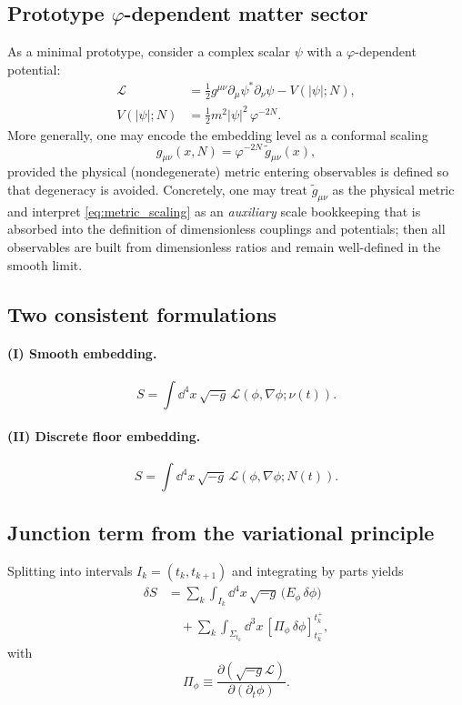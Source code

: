 \documentclass[
  reprint,
  amsmath,amssymb,
  aps,
  prd,
  superscriptaddress,
  nofootinbib,
  longbibliography
]{revtex4-2}
\newcommand{\phig}{\varphi}
\newcommand{\Sig}{\Sigma}
\theoremstyle{definition}
\theoremstyle{remark}
\begin{document}
\subsection{\texorpdfstring{Prototype $\phig$-dependent matter sector}{Prototype phi-dependent matter sector}}
As a minimal prototype, consider a complex scalar $\psi$ with a $\phig$-dependent potential:
\begin{align}
\mathcal L
&=\frac12 g^{\mu\nu}\partial_\mu\psi^*\partial_\nu\psi - V(|\psi|;N),
\nonumber\\
V(|\psi|;N)
&=\frac12 m^2|\psi|^2\,\phig^{-2N}.
\label{eq:prototype_L}
\end{align}
More generally, one may encode the embedding level as a conformal scaling
\begin{equation}
g_{\mu\nu}(x,N)=\phig^{-2N}\,\tilde g_{\mu\nu}(x),
\label{eq:metric_scaling}
\end{equation}
provided the physical (nondegenerate) metric entering observables is defined so that degeneracy is avoided.
Concretely, one may treat \(\tilde g_{\mu\nu}\) as the physical metric and interpret \eqref{eq:metric_scaling}
as an \emph{auxiliary} scale bookkeeping that is absorbed into the definition of dimensionless couplings and
potentials; then all observables are built from dimensionless ratios and remain well-defined in the smooth limit.

\subsection{Two consistent formulations}
\paragraph{(I) Smooth embedding.}
\begin{equation}
S=\int \dd^4x\,\sqrt{-g}\,\mathcal L(\phi,\nabla\phi;\nu(t)).
\label{eq:action_smooth_nu}
\end{equation}

\paragraph{(II) Discrete floor embedding.}
\begin{equation}
S=\int \dd^4x\,\sqrt{-g}\,\mathcal L(\phi,\nabla\phi;N(t)).
\label{eq:action_floorN}
\end{equation}

\subsection{Junction term from the variational principle}
Splitting into intervals $I_k=(t_k,t_{k+1})$ and integrating by parts yields
\begin{align}
\delta S
&=\sum_k \int_{I_k}\dd^4x\,\sqrt{-g}\,\Big(E_\phi\,\delta\phi\Big)
\nonumber\\
&\quad+\sum_k \int_{\Sig_{t_k}}\dd^3x\,\left[\Pi_\phi\,\delta\phi\right]_{t_k^-}^{t_k^+},
\label{eq:deltaS_junction}
\end{align}
with
\begin{equation}
\Pi_\phi\equiv \frac{\partial(\sqrt{-g}\mathcal L)}{\partial(\partial_t\phi)}.
\label{eq:Pi_def}
\end{equation}
\end{document}
